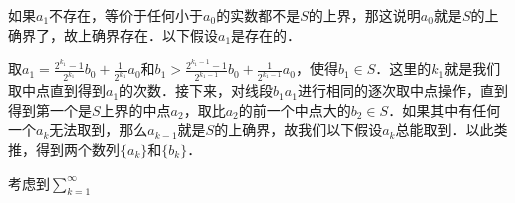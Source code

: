 如果$a_1$不存在，等价于任何小于$a_0$的实数都不是$S$的上界，那这说明$a_0$就是$S$的上确界了，故上确界存在．以下假设$a_1$是存在的．


取$a_1=\frac{2^{k_1}-1}{2^{k_1}}b_0+\frac{1}{2^{k_1}}a_0$和$b_1>\frac{2^{{k_1}-1}-1}{2^{{k_1}-1}}b_0+\frac{1}{2^{{k_1}-1}}a_0$，使得$b_1\in S$．这里的$k_1$就是我们取中点直到得到$a_1$的次数．接下来，对线段$b_1a_1$进行相同的逐次取中点操作，直到得到第一个是$S$上界的中点$a_2$，取比$a_2$的前一个中点大的$b_2\in S$．如果其中有任何一个$a_k$无法取到，那么$a_{k-1}$就是$S$的上确界，故我们以下假设$a_k$总能取到．以此类推，得到两个数列$\{a_k\}$和$\{b_k\}$．

考虑到$\sum\limits_{k=1}^\infty$

















